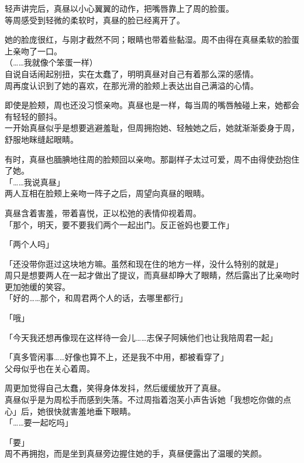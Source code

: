 轻声讲完后，真昼以小心翼翼的动作，把嘴唇靠上了周的脸蛋。\\

等周感受到轻微的柔软时，真昼的脸已经离开了。

她的脸庞很红，与刚才截然不同；眼睛也带着些黏湿。周不由得在真昼柔软的脸蛋上亲吻了一口。\\

（……我就像个笨蛋一样）\\

自说自话闹起别扭，实在太蠢了，明明真昼对自己有着那么深的感情。\\

周再度认识到了她的喜欢，在那光滑的脸颊上表达出自己满溢的心情。

即使是脸颊，周也还没习惯亲吻。真昼也是一样，每当周的嘴唇触碰上来，她都会有轻轻的颤抖。\\

一开始真昼似乎是想要逃避羞耻，但周拥抱她、轻触她之后，她就渐渐委身于周，舒服地眯缝起眼睛。

有时，真昼也腼腆地往周的脸颊回以亲吻。那副样子太过可爱，周不由得使劲抱住了她。\\

「……我说真昼」\\

两人互相在脸颊上亲吻一阵子之后，周望向真昼的眼睛。

真昼含着害羞，带着喜悦，正以松弛的表情仰视着周。\\

「那个，明天，要不要我们两个一起出门。反正爸妈也要工作」

「两个人吗」

「还没带你逛过这块地方嘛。虽然和现在住的地方一样，没什么特别的就是」\\

周只是想要两人在一起才做出了提议，而真昼却睁大了眼睛，然后露出了比亲吻时更加弛缓的笑容。\\

「好的……那个，和周君两个人的话，去哪里都行」

「哦」

「今天我还想再像现在这样待一会儿……志保子阿姨他们也让我陪周君一起」

「真多管闲事……好像也算不上，还是我不中用，都被看穿了」\\

父母似乎也在关心着周。

周更加觉得自己太蠢，笑得身体发抖，然后缓缓放开了真昼。\\

真昼似乎是为周松手而感到失落。不过周指着泡芙小声告诉她「我想吃你做的点心」后，她很快就害羞地垂下眼睛。\\

「……要一起吃吗」

「要」\\

周不再拥抱，而是坐到真昼旁边握住她的手，真昼便露出了温暖的笑颜。
